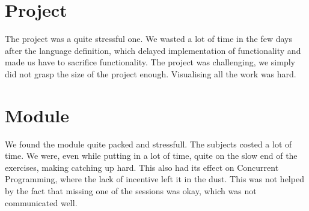 \documentclass[10pt,a4paper]{report}
\begin{document}
\section{Project}
The project was a quite stressful one. We wasted a lot of time in the few days after the language definition, which delayed implementation of functionality and made us have to sacrifice functionality. The project was challenging, we simply did not grasp the size of the project enough. Visualising all the work was hard. 
\section{Module}
We found the module quite packed and stressfull. The subjects costed a lot of time. We were, even while putting in a lot of time, quite on the slow end of the exercises, making catching up hard. This also had its effect on Concurrent Programming, where the lack of incentive left it in the dust. This was not helped by the fact that missing one of the sessions was okay, which was not communicated well. 
\end{document}
